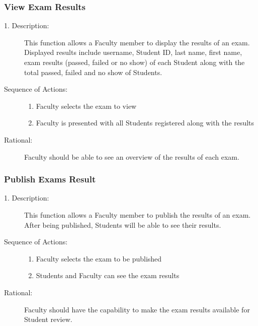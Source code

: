    \subsubsection{\large View Exam Results} 
   \begin{boxed} %
      \begin{description}
         \item[1. Description:\label{desc:view_results}]
      This function allows a Faculty member to display the results of an
         exam. Displayed results include username, Student ID, last name, first
         name, exam results (passed, failed or no show) of each Student along
         with the total passed, failed and no show of Students.
         
            \item[Sequence of Actions:]\hspace{10cm}
         \begin{enumerate}
               
            \item Faculty selects the exam to view
            \item Faculty is presented with all Students registered along with
               the results
         \end{enumerate}

            \item[Rational:]
         Faculty should be able to see an overview of the results of each exam.
      \end{description}
   \end{boxed} %

   \subsubsection{\large Publish Exams Result} 
   \begin{boxed} %
      \begin{description}
         \item[1. Description:\label{desc:publish_results}]
      This function allows a Faculty member to publish the results of an
         exam. After being published, Students will be able to see their
         results.
         
            \item[Sequence of Actions:]\hspace{10cm}
         \begin{enumerate}
            \item Faculty selects the exam to be published
            \item Students and Faculty can see the exam results
      \end{enumerate}

            \item[Rational:]
         Faculty should have the capability to make the exam
         results available for Student review.
      \end{description}
   \end{boxed} %


